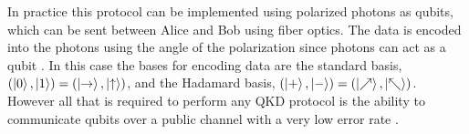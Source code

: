 In practice this protocol can be implemented using polarized photons as qubits, which can be sent between Alice and Bob using fiber optics.
The data is encoded into the photons using the angle of the polarization since photons can act as a qubit \cite{qc:agi}.
In this case the bases for encoding data are the standard basis, $(\ket{0}, \ket{1}) = (\ket{\rightarrow}, \ket{\uparrow})$, and the Hadamard basis, $(\ket{+}, \ket{-}) = (\ket{\nearrow}, \ket{\nwarrow})$.
However all that is required to perform any QKD protocol is the ability to communicate qubits over a public channel with a very low error rate \cite{MikeAndIke}.
